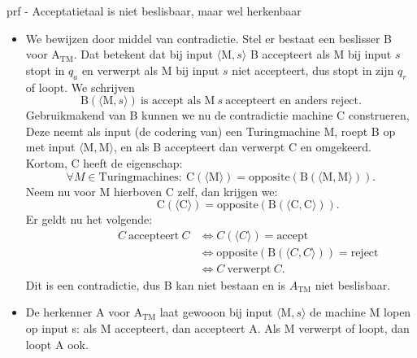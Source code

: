 \begin{prf}{prf - Acceptatietaal is niet beslisbaar, maar wel herkenbaar}
    \begin{itemize}
        \item 
            We bewijzen door middel van contradictie. Stel er bestaat een beslisser B voor A$_{\text{TM}}$. Dat betekent dat bij input $\langle \text{M},s \rangle$ B accepteert als M bij input $s$ stopt in $q_a$ en verwerpt als M bij input $s$ niet accepteert, dus stopt in zijn $q_r$ of loopt. We schrijven
            \begin{equation*}
                \text{B}(\langle \text{M},s \rangle) \ \text{is accept als M} \ s \ \text{accepteert en anders reject}.
            \end{equation*}
            Gebruikmakend van B kunnen we nu de contradictie machine C construeren, Deze neemt als input (de codering van) een Turingmachine M, roept B op met input $\langle \text{M}, \text{M} \rangle$, en als B accepteert dan verwerpt C en omgekeerd. Kortom, C heeft de eigenschap:
            \begin{equation*}
                \forall M \in \text{Turingmachines}: \ \text{C}(\langle \text{M} \rangle) = \text{opposite}(\text{B}(\langle \text{M}, \text{M} \rangle)).
            \end{equation*}
            Neem nu voor M hierboven C zelf, dan krijgen we:
            \begin{equation*}
                \hspace{2cm}\text{C}(\langle \text{C} \rangle) = \text{opposite}(\text{B}(\langle \text{C}, \text{C} \rangle)).
            \end{equation*}
            Er geldt nu het volgende:
            \begin{align*}
                \hspace{2cm}
                C \ \text{accepteert} \ C 
                    &\Leftrightarrow C(\langle C \rangle) = \text{accept} \\
                    &\Leftrightarrow \text{opposite}(\text{B}(\langle C, C \rangle)) = \text{reject} \\
                    &\Leftrightarrow C \ \text{verwerpt} \ C.
            \end{align*}
            Dit is een contradictie, dus B kan niet bestaan en is $A_{\text{TM}}$ niet beslisbaar.
        \item 
            De herkenner A voor A$_{\text{TM}}$ laat gewooon bij input $\langle \text{M},s \rangle$ de machine M lopen op input s: als M accepteert, dan accepteert A. Als M verwerpt of loopt, dan loopt A ook.
    \end{itemize}
    \vspace{-0.3cm}
\end{prf}

